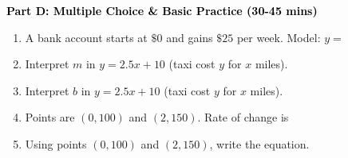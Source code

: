 \documentclass[12pt, letterpaper, fleqn]{article}
\newcommand{\blank}{\underline{\hspace{2.2cm}}}
\begin{document}
\newpage

\begin{tcolorbox}[colback=customteal!20]
\large\textcolor{black}{\textbf{Part D: Multiple Choice \& Basic Practice (30-45 mins)}}
\end{tcolorbox}

\vspace{3mm}

\begin{enumerate}[itemsep=2.5cm, leftmargin=0.6cm, resume]
\item A bank account starts at $\$0$ and gains $\$25$ per week. Model: $y = $ \blank
\item Interpret $m$ in $y = 2.5x + 10$ (taxi cost $y$ for $x$ miles). \blank
\item Interpret $b$ in $y = 2.5x + 10$ (taxi cost $y$ for $x$ miles). \blank
\item Points are $(0, 100)$ and $(2, 150)$. Rate of change is \blank
\item Using points $(0, 100)$ and $(2, 150)$, write the equation. \blank
\end{enumerate}
\end{document}

